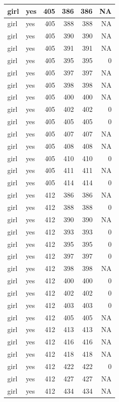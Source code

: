\documentclass[man]{apa6}
\begin{document}
\begin{tabular}{l|l|r|r|r|r}
\hline
girl & yes & 405 & 386 & 386 & NA\\
\hline
girl & yes & 405 & 388 & 388 & NA\\
\hline
girl & yes & 405 & 390 & 390 & NA\\
\hline
girl & yes & 405 & 391 & 391 & NA\\
\hline
girl & yes & 405 & 395 & 395 & 0\\
\hline
girl & yes & 405 & 397 & 397 & NA\\
\hline
girl & yes & 405 & 398 & 398 & NA\\
\hline
girl & yes & 405 & 400 & 400 & NA\\
\hline
girl & yes & 405 & 402 & 402 & 0\\
\hline
girl & yes & 405 & 405 & 405 & 0\\
\hline
girl & yes & 405 & 407 & 407 & NA\\
\hline
girl & yes & 405 & 408 & 408 & NA\\
\hline
girl & yes & 405 & 410 & 410 & 0\\
\hline
girl & yes & 405 & 411 & 411 & NA\\
\hline
girl & yes & 405 & 414 & 414 & 0\\
\hline
girl & yes & 412 & 386 & 386 & NA\\
\hline
girl & yes & 412 & 388 & 388 & 0\\
\hline
girl & yes & 412 & 390 & 390 & NA\\
\hline
girl & yes & 412 & 393 & 393 & 0\\
\hline
girl & yes & 412 & 395 & 395 & 0\\
\hline
girl & yes & 412 & 397 & 397 & 0\\
\hline
girl & yes & 412 & 398 & 398 & NA\\
\hline
girl & yes & 412 & 400 & 400 & 0\\
\hline
girl & yes & 412 & 402 & 402 & 0\\
\hline
girl & yes & 412 & 403 & 403 & 0\\
\hline
girl & yes & 412 & 405 & 405 & NA\\
\hline
girl & yes & 412 & 413 & 413 & NA\\
\hline
girl & yes & 412 & 416 & 416 & NA\\
\hline
girl & yes & 412 & 418 & 418 & NA\\
\hline
girl & yes & 412 & 422 & 422 & 0\\
\hline
girl & yes & 412 & 427 & 427 & NA\\
\hline
girl & yes & 412 & 434 & 434 & NA\\

\end{tabular}
\end{document}
